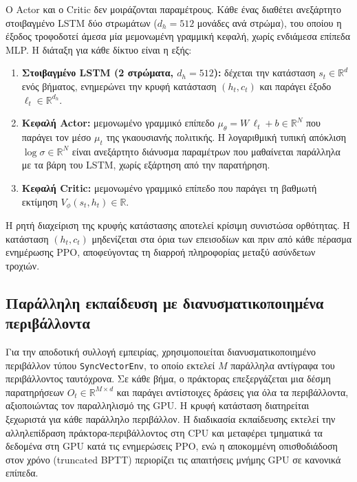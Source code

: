 Ο Actor και ο Critic δεν μοιράζονται παραμέτρους. Κάθε ένας διαθέτει
ανεξάρτητο στοιβαγμένο LSTM δύο στρωμάτων ($d_h = 512$ μονάδες ανά
στρώμα), του οποίου η έξοδος τροφοδοτεί άμεσα μία μεμονωμένη γραμμική
κεφαλή, χωρίς ενδιάμεσα επίπεδα MLP. Η διάταξη για κάθε δίκτυο είναι η
εξής:

\begin{enumerate}
  \item \textbf{Στοιβαγμένο LSTM (2 στρώματα, $d_h = 512$):} δέχεται την
        κατάσταση $s_t \in \mathbb{R}^{d}$ ενός βήματος, ενημερώνει την
        κρυφή κατάσταση $(h_t, c_t)$ και παράγει έξοδο
        $\ell_t \in \mathbb{R}^{d_h}$.
  \item \textbf{Κεφαλή Actor:} μεμονωμένο γραμμικό επίπεδο
        $\mu_\theta = W\,\ell_t + b \in \mathbb{R}^{N}$ που παράγει τον
        μέσο $\mu_t$ της γκαουσιανής πολιτικής. Η λογαριθμική τυπική
        απόκλιση $\log\sigma \in \mathbb{R}^{N}$ είναι ανεξάρτητο διάνυσμα
        παραμέτρων που μαθαίνεται παράλληλα με τα βάρη του LSTM, χωρίς
        εξάρτηση από την παρατήρηση.
  \item \textbf{Κεφαλή Critic:} μεμονωμένο γραμμικό επίπεδο που παράγει
        τη βαθμωτή εκτίμηση $V_\phi(s_t, h_t) \in \mathbb{R}$.
\end{enumerate}

Η ρητή διαχείριση της κρυφής κατάστασης αποτελεί κρίσιμη συνιστώσα ορθότητας.
Η κατάσταση $(h_t, c_t)$ μηδενίζεται στα όρια των επεισοδίων και πριν από κάθε
πέρασμα ενημέρωσης PPO, αποφεύγοντας τη διαρροή πληροφορίας μεταξύ ασύνδετων
τροχιών.

\subsection{Παράλληλη εκπαίδευση με διανυσματικοποιημένα περιβάλλοντα}

Για την αποδοτική συλλογή εμπειρίας, χρησιμοποιείται διανυσματικοποιημένο
περιβάλλον τύπου \texttt{SyncVectorEnv}, το οποίο εκτελεί $M$ παράλληλα
αντίγραφα του περιβάλλοντος ταυτόχρονα. Σε κάθε βήμα, ο πράκτορας επεξεργάζεται
μια δέσμη παρατηρήσεων $O_t \in \mathbb{R}^{M \times d}$ και παράγει
αντίστοιχες δράσεις για όλα τα περιβάλλοντα, αξιοποιώντας τον παραλληλισμό της
GPU. Η κρυφή κατάσταση διατηρείται ξεχωριστά για κάθε παράλληλο περιβάλλον. Η 
διαδικασία εκπαίδευσης εκτελεί την αλληλεπίδραση πράκτορα-περιβάλλοντος στη CPU και
μεταφέρει τμηματικά τα δεδομένα στη GPU κατά τις ενημερώσεις PPO, ενώ η
αποκομμένη οπισθοδιάδοση στον χρόνο (truncated BPTT) περιορίζει τις απαιτήσεις
μνήμης GPU σε κανονικά επίπεδα.


